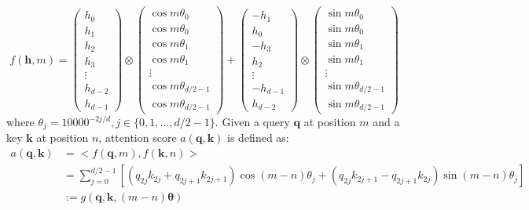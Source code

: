 \documentclass[11pt, a4paper, logo, copyright, nonumbering]{map}
\begin{document}
\begin{itemize}
\begin{equation}
	f(\mathbf{h},m) = 
	\begin{pmatrix}
		h_0\\
		h_1\\
		h_2\\
		h_3\\
		\vdots\\
		h_{d-2}\\
		h_{d-1}
	\end{pmatrix}
	\otimes
	\begin{pmatrix}
		\cos{m\theta_0} \\
		\cos{m\theta_0} \\
		\cos{m\theta_1} \\
		\cos{m\theta_1} \\
		\vdots \\
		\cos{m\theta_{d/2-1}} \\
		\cos{m\theta_{d/2-1}} 
	\end{pmatrix}
	+
	\begin{pmatrix}
		-h_1\\
		h_0\\
		-h_3\\
		h_2\\
		\vdots\\
		-h_{d-1}\\
		h_{d-2}
	\end{pmatrix}
	\otimes
	\begin{pmatrix}
		\sin{m\theta_0}\\
		\sin{m\theta_0}\\
		\sin{m\theta_1}\\
		\sin{m\theta_1}\\
		\vdots\\
		\sin{m\theta_{d/2-1}}\\
		\sin{m\theta_{d/2-1}}
	\end{pmatrix}
\end{equation}
where $\theta_j=10000^{-2j/d},j\in\{0,1,...,d/2-1\}$. 
Given a query $\mathbf{q}$ at position $m$ and a key $\mathbf{k}$ at position $n$, attention score $a(\mathbf{q},\mathbf{k})$ is defined as:
\begin{align} 
a(\mathbf{q},\mathbf{k})&=<f(\mathbf{q},m), f(\mathbf{k},n)> \nonumber \\
&=\sum_{j=0}^{d/2-1}[(q_{2j}k_{2j}+q_{2j+1}k_{2j+1})\cos{(m-n)\theta_{j}}+(q_{2j}k_{2j+1}-q_{2j+1}k_{2j})\sin{(m-n)\theta_{j}}] \nonumber \\
&:=g(\mathbf{q},\mathbf{k},(m-n)\boldsymbol{\theta}) 
\label{eqn:attention_score}

\end{align}
\end{itemize}
\end{document}
